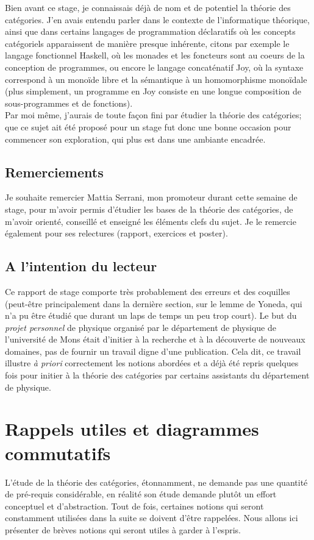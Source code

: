 \documentclass{article}
\begin{document}
Bien avant ce stage, je connaissais déjà de nom et de potentiel la théorie des catégories. J'en avais entendu parler dans le contexte de l'informatique théorique, ainsi que dans certains langages de programmation déclaratifs où les concepts catégoriels apparaissent de manière presque inhérente, citons par exemple le langage fonctionnel Haskell, où les monades et les foncteurs sont au coeurs de la conception de programmes, ou encore le langage concaténatif Joy, où la syntaxe correspond à un monoïde libre et la sémantique à un homomorphisme monoïdale (plus simplement, un programme en Joy consiste en une longue composition de sous-programmes et de fonctions).\\

Par moi même, j'aurais de toute façon fini par étudier la théorie des catégories; que ce sujet ait été proposé pour un stage fut donc une bonne occasion pour commencer son exploration, qui plus est dans une ambiante encadrée.

\subsection{Remerciements}
Je souhaite remercier Mattia Serrani, mon promoteur durant cette semaine de stage, pour m'avoir permis d'étudier les bases de la théorie des catégories, de m'avoir orienté, conseillé et enseigné les éléments clefs du sujet. Je le remercie également pour ses relectures (rapport, exercices et poster).

\subsection{A l'intention du lecteur}
Ce rapport de stage comporte très probablement des erreurs et des coquilles (peut-être principalement dans la dernière section, sur le lemme de Yoneda, qui n'a pu être étudié que durant un laps de temps un peu trop court). Le but du \textit{projet personnel} de physique organisé par le département de physique de l'université de Mons était d'initier à la recherche et à la découverte de nouveaux domaines, pas de fournir un travail digne d'une publication. Cela dit, ce travail illustre \textit{à priori} correctement les notions abordées et a déjà été repris quelques fois pour initier à la théorie des catégories par certains assistants du département de physique.

\newpage
\section{Rappels utiles et diagrammes commutatifs}
L'étude de la théorie des catégories, étonnamment, ne demande pas une quantité de pré-requis considérable, en réalité son étude demande plutôt un effort conceptuel et d'abstraction. Tout de fois, certaines notions qui seront constamment utilisées dans la suite se doivent d'être rappelées. Nous allons ici présenter de brèves notions qui seront utiles à garder à l'espris.
\end{document}
